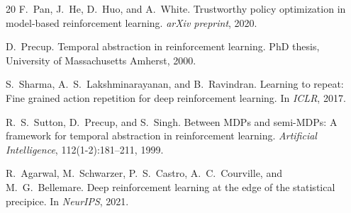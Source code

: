 \documentclass[10pt,letterpaper]{article}
\begin{document}
\begin{thebibliography}{20}
F.~Pan, J.~He, D.~Huo, and A.~White.
\newblock Trustworthy policy optimization in model-based reinforcement learning.
\newblock \emph{arXiv preprint}, 2020.

D.~Precup.
\newblock Temporal abstraction in reinforcement learning.
\newblock PhD thesis, University of Massachusetts Amherst, 2000.

S.~Sharma, A.~S.~Lakshminarayanan, and B.~Ravindran.
\newblock Learning to repeat: Fine grained action repetition for deep reinforcement learning.
\newblock In \emph{ICLR}, 2017.

R.~S.~Sutton, D.~Precup, and S.~Singh.
\newblock Between {MDP}s and semi-{MDP}s: A framework for temporal abstraction in reinforcement learning.
\newblock \emph{Artificial Intelligence}, 112(1-2):181--211, 1999.

R.~Agarwal, M.~Schwarzer, P.~S.~Castro, A.~C.~Courville, and M.~G.~Bellemare.
\newblock Deep reinforcement learning at the edge of the statistical precipice.
\newblock In \emph{NeurIPS}, 2021.

\end{thebibliography}
\end{document}
